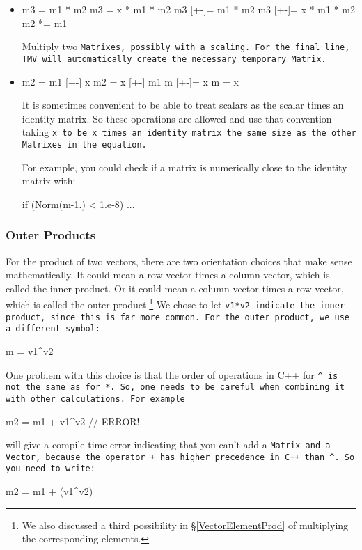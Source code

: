 \begin{itemize}
\item
\begin{tmvcode}
m3 = m1 * m2
m3 = x * m1 * m2
m3 [+-]= m1 * m2
m3 [+-]= x * m1 * m2
m2 *= m1
\end{tmvcode}
Multiply two \tt{Matrix}es, possibly with a scaling.  For the final line, TMV will automatically create the necessary temporary \tt{Matrix}.

\item
\begin{tmvcode}
m2 = m1 [+-] x
m2 = x [+-] m1
m [+-]= x
m = x
\end{tmvcode}
It is sometimes convenient to be able to treat scalars as the scalar times an
identity matrix.  So these operations are allowed and use that convention taking \tt{x} to be
\tt{x} times an identity matrix the same size as the other \tt{Matrix}es in the equation.

For example, you could check if a matrix is numerically close to the identity matrix 
with:
\begin{tmvcode}
if (Norm(m-1.) < 1.e-8) { ... }
\end{tmvcode}

\end{itemize}


\subsubsection{Outer Products}
\label{outerproduct}

For the product of two vectors, there are two orientation choices that make sense mathematically.
It could mean a row vector times a column vector, which is called the inner product.
Or it could mean a column vector times a row vector, which is called the outer product.\footnote{
We also discussed a third possibility in \S\ref{VectorElementProd} of multiplying the 
corresponding elements.}
We chose to let \tt{v1*v2} indicate the inner product, since this is far more common.
For the outer product, we use a different symbol:
\begin{tmvcode}
m = v1^v2
\end{tmvcode}
One problem with this choice is that the order of operations in C++ for \tt{\^} 
is not the same as for \tt{*}.  
So, one needs to be careful when combining it with other calculations.
For example
\begin{tmvcode}
m2 = m1 + v1^v2   // ERROR!
\end{tmvcode}
will give a compile time error indicating that you can't add a 
\tt{Matrix} and a \tt{Vector}, 
because the operator \tt{+} has higher precedence in C++ than \tt{\^}.
So you need to write:
\begin{tmvcode}
m2 = m1 + (v1^v2)
\end{tmvcode}

